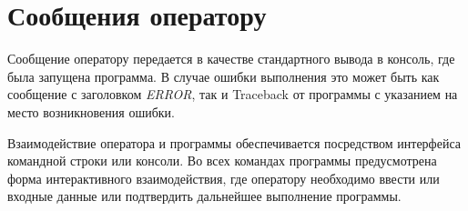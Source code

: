 \newpage
\section{Сообщения оператору}

Сообщение оператору передается в качестве стандартного вывода в консоль, где была запущена программа. В случае ошибки выполнения это может быть как сообщение с заголовком \textit{ERROR}, так и Traceback от программы с указанием на место возникновения ошибки.

Взаимодействие оператора и программы обеспечивается посредством интерфейса командной строки или консоли.
Во всех командах программы предусмотрена форма интерактивного взаимодействия, где оператору необходимо ввести или входные данные или подтвердить дальнейшее выполнение программы.
